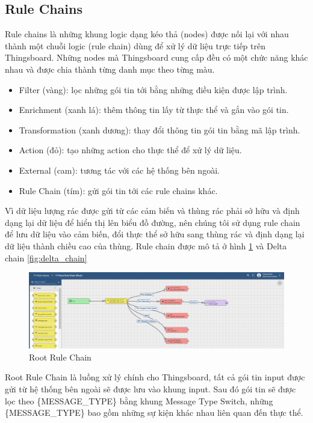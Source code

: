 \subsection{Rule Chains}
Rule chains là những khung logic dạng kéo thả (nodes) được nối lại với nhau thành một chuỗi logic (rule chain) dùng để xử lý dữ liệu trực tiếp trên Thingsboard. Những nodes mà Thingsboard cung cấp đều có một chức năng khác nhau và được chia thành từng danh mục theo từng màu.
\begin{itemize}
    \item Filter (vàng): lọc những gói tin tới bằng những điều kiện được lập trình.
    \item Enrichment (xanh lá): thêm thông tin lấy từ thực thể và gắn vào gói tin. 
    \item Transformation (xanh dương): thay đổi thông tin gói tin bằng mã lập trình.
    \item Action (đỏ): tạo những action cho thực thể để xử lý dữ liệu.
    \item External (cam): tương tác với các hệ thống bên ngoài.
    \item Rule Chain (tím): gửi gói tin tới các rule chains khác.
\end{itemize}

Vì dữ liệu lượng rác được gửi từ các cảm biến và thùng rác phải sở hữu và định dạng lại dữ liệu để hiển thị lên biểu đồ đường, nên chúng tôi sử dụng rule chain để lưu dữ liệu vào cảm biến, đổi thực thể sở hữu sang thùng rác và định dạng lại dữ liệu thành chiều cao của thùng. Rule chain được mô tả ở hình \ref{fig:root_chain} và Delta chain \ref{fig:delta_chain}
\begin{figure}[H]
    \centering
    \includegraphics[width=\textwidth]{images/Khanh/Thingsboard/Root_rule_chain.PNG}
    \caption{Root Rule Chain}
    \label{fig:root_chain}
\end{figure}
Root Rule Chain là luồng xử lý chính cho Thingsboard, tất cả gói tin input được gửi từ hệ thống bên ngoài sẽ được lưu vào khung input. Sau đó gói tin sẽ được lọc theo \{MESSAGE\_TYPE\} bằng khung Message Type Switch, những \{MESSAGE\_TYPE\} bao gồm những sự kiện khác nhau liên quan đến thực thể. 

